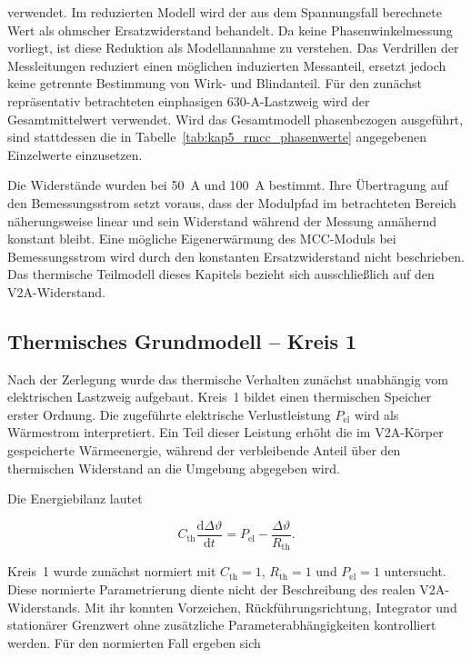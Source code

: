 verwendet. Im reduzierten Modell wird der aus dem Spannungsfall berechnete
Wert als ohmscher Ersatzwiderstand behandelt. Da keine Phasenwinkelmessung
vorliegt, ist diese Reduktion als Modellannahme zu verstehen. Das Verdrillen
der Messleitungen reduziert einen möglichen induzierten Messanteil, ersetzt
jedoch keine getrennte Bestimmung von Wirk- und Blindanteil. Für den zunächst
repräsentativ betrachteten einphasigen 630-A-Lastzweig wird der
Gesamtmittelwert verwendet. Wird das Gesamtmodell phasenbezogen ausgeführt,
sind stattdessen die in Tabelle~\ref{tab:kap5_rmcc_phasenwerte} angegebenen
Einzelwerte einzusetzen.

Die Widerstände wurden bei \SI{50}{\ampere} und \SI{100}{\ampere}
bestimmt. Ihre Übertragung auf den Bemessungsstrom setzt voraus, dass der
Modulpfad im betrachteten Bereich näherungsweise linear und sein Widerstand
während der Messung annähernd konstant bleibt. Eine mögliche Eigenerwärmung des
MCC-Moduls bei Bemessungsstrom wird durch den konstanten Ersatzwiderstand
nicht beschrieben. Das thermische Teilmodell dieses Kapitels bezieht sich
ausschließlich auf den V2A-Widerstand.



\subsection{Thermisches Grundmodell -- Kreis 1}
\label{sec:thermisches_modell_kreis1}

Nach der Zerlegung wurde das thermische Verhalten zunächst unabhängig vom
elektrischen Lastzweig aufgebaut. Kreis~1 bildet einen thermischen Speicher
erster Ordnung. Die zugeführte elektrische Verlustleistung
\(P_\mathrm{el}\) wird als Wärmestrom interpretiert. Ein Teil dieser Leistung
erhöht die im V2A-Körper gespeicherte Wärmeenergie, während der verbleibende
Anteil über den thermischen Widerstand an die Umgebung abgegeben wird.

Die Energiebilanz lautet

\begin{equation}
    C_\mathrm{th}\frac{\mathrm{d}\Delta\vartheta}{\mathrm{d}t}
    =
    P_\mathrm{el}
    -
    \frac{\Delta\vartheta}{R_\mathrm{th}}.
    \label{eq:kap5_kreis1_dgl}
\end{equation}

Kreis~1 wurde zunächst normiert mit
\(C_\mathrm{th}=1\), \(R_\mathrm{th}=1\) und
\(P_\mathrm{el}=1\) untersucht. Diese normierte Parametrierung
diente nicht der Beschreibung des realen V2A-Widerstands. Mit ihr konnten
Vorzeichen, Rückführungsrichtung, Integrator und stationärer Grenzwert ohne
zusätzliche Parameterabhängigkeiten kontrolliert werden. Für den normierten
Fall ergeben sich

